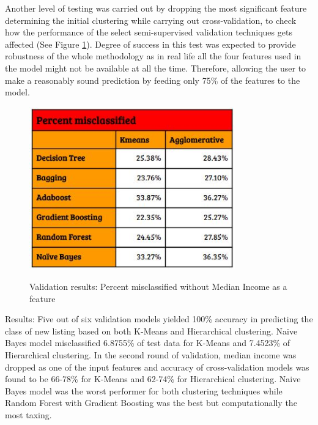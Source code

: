 \documentclass[conference]{IEEEtran}
\begin{document}
Another level of testing was carried out by dropping the most significant feature determining the initial clustering while carrying out cross-validation, to check how the performance of the select semi-supervised validation techniques gets affected (See Figure \ref{Validation Result table 2}). Degree of success in this test was expected to provide robustness of the whole methodology as in real life all the four features used in the model might not be available at all the time. Therefore, allowing the user to make a reasonably sound prediction by feeding only 75\% of the features to the model. 

\begin{figure}
\centering
\caption{Validation results: Percent misclassified without Median Income as a feature}
\includegraphics[width=3.5in]{ML_3_Features.JPG}
\label{Validation Result table 2}
\end{figure}

Results: Five out of six validation models yielded 100\% accuracy in predicting the class of new listing based on both K-Means and Hierarchical clustering. Naive Bayes model misclassified 6.8755\% of test data for K-Means and 7.4523\% of Hierarchical clustering. In the second round of validation, median income was dropped as one of the input features and accuracy of cross-validation models was found to be 66-78\% for K-Means and 62-74\% for Hierarchical clustering. Naive Bayes model was the worst performer for both clustering techniques while Random Forest with Gradient Boosting was the best but computationally the most taxing. 
\end{document}
